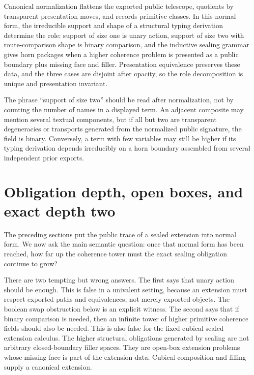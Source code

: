 \documentclass{lmcs}
\begin{document}
Canonical normalization flattens the exported public telescope, quotients by transparent
presentation moves, and records primitive classes.  In this normal form, the irreducible
support and shape of a structural typing derivation determine the role: support of size one is
unary action, support of size two with route-comparison shape is binary comparison, and the
inductive sealing grammar gives horn packages when a higher coherence problem is presented as
a public boundary plus missing face and filler.  Presentation equivalence preserves these data,
and the three cases are disjoint after opacity, so the role decomposition is unique and
presentation invariant.

\begin{rem}
The phrase ``support of size two'' should be read after normalization, not by counting the
number of names in a displayed term.  An adjacent composite may mention several textual
components, but if all but two are transparent degeneracies or transports generated from the
normalized public signature, the field is binary.  Conversely, a term with few variables may
still be higher if its typing derivation depends irreducibly on a horn boundary assembled from
several independent prior exports.
\end{rem}


\section{Obligation depth, open boxes, and exact depth two}
\label{sec:depth-two}

The preceding sections put the public trace of a sealed extension into normal form.  We now
ask the main semantic question: once that normal form has been reached, how far up the
coherence tower must the exact sealing obligation continue to grow?

There are two tempting but wrong answers.  The first says that unary action should be
enough.  This is false in a univalent setting, because an extension must respect exported
paths and equivalences, not merely exported objects.  The boolean swap obstruction below is
an explicit witness.  The second says that if binary comparison is needed, then an infinite
tower of higher primitive coherence fields should also be needed.  This is also false for the
fixed cubical sealed-extension calculus.  The higher structural obligations generated by
sealing are not arbitrary closed-boundary filler spaces.  They are open-box extension
problems whose missing face is part of the extension data.  Cubical composition and filling
supply a canonical extension.
\end{document}
